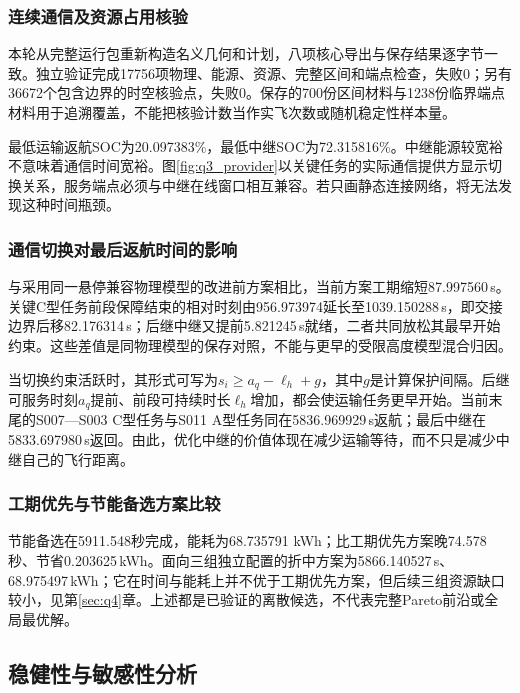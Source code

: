 \subsubsection{连续通信及资源占用核验}
本轮从完整运行包重新构造名义几何和计划，八项核心导出与保存结果逐字节一致。独立验证完成17756项物理、能源、资源、完整区间和端点检查，失败0；另有36672个包含边界的时空核验点，失败0。保存的700份区间材料与1238份临界端点材料用于追溯覆盖，不能把核验计数当作实飞次数或随机稳定性样本量。

最低运输返航SOC为20.097383\%，最低中继SOC为72.315816\%。中继能源较宽裕不意味着通信时间宽裕。图\ref{fig:q3_provider}以关键任务的实际通信提供方显示切换关系，服务端点必须与中继在线窗口相互兼容。若只画静态连接网络，将无法发现这种时间瓶颈。



\subsubsection{通信切换对最后返航时间的影响}
与采用同一悬停兼容物理模型的改进前方案相比，当前方案工期缩短87.997560\,s。关键C型任务前段保障结束的相对时刻由956.973974延长至1039.150288\,s，即交接边界后移82.176314\,s；后继中继又提前5.821245\,s就绪，二者共同放松其最早开始约束。这些差值是同物理模型的保存对照，不能与更早的受限高度模型混合归因。

当切换约束活跃时，其形式可写为$s_i\ge a_q-\ell_h+g$，其中$g$是计算保护间隔。后继可服务时刻$a_q$提前、前段可持续时长$\ell_h$增加，都会使运输任务更早开始。当前末尾的S007—S003 C型任务与S011 A型任务同在5836.969929\,s返航；最后中继在5833.697980\,s返回。由此，优化中继的价值体现在减少运输等待，而不只是减少中继自己的飞行距离。

\subsubsection{工期优先与节能备选方案比较}
节能备选在5911.548秒完成，能耗为68.735791 kWh；比工期优先方案晚74.578秒、节省0.203625\,kWh。面向三组独立配置的折中方案为5866.140527\,s、68.975497\,kWh；它在时间与能耗上并不优于工期优先方案，但后续三组资源缺口较小，见第\ref{sec:q4}章。上述都是已验证的离散候选，不代表完整Pareto前沿或全局最优解。

\subsection{稳健性与敏感性分析}
\label{sec:q3_robust}
